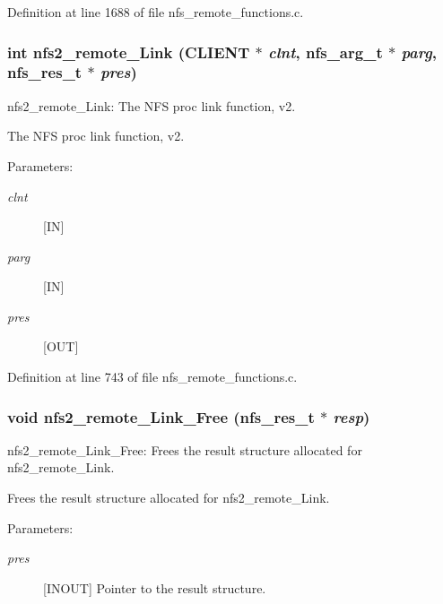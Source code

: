 Definition at line 1688 of file nfs\_\-remote\_\-functions.c.
\subsubsection[{nfs2\_\-remote\_\-Link}]{\setlength{\rightskip}{0pt plus 5cm}int nfs2\_\-remote\_\-Link (CLIENT $\ast$ {\em clnt}, \/  nfs\_\-arg\_\-t $\ast$ {\em parg}, \/  nfs\_\-res\_\-t $\ast$ {\em pres})}\label{group__NFSprocs_g3ab0ff45754d77b4f491663c61ffd6cb}


nfs2\_\-remote\_\-Link: The NFS proc link function, v2.

The NFS proc link function, v2.

\begin{Desc}
\item[Parameters:]
\begin{description}
\item[{\em clnt}][IN] \item[{\em parg}][IN] \item[{\em pres}][OUT] \end{description}
\end{Desc}


Definition at line 743 of file nfs\_\-remote\_\-functions.c.
\subsubsection[{nfs2\_\-remote\_\-Link\_\-Free}]{\setlength{\rightskip}{0pt plus 5cm}void nfs2\_\-remote\_\-Link\_\-Free (nfs\_\-res\_\-t $\ast$ {\em resp})}\label{group__NFSprocs_g0f3806f9da2e535d33a6b3624597df16}


nfs2\_\-remote\_\-Link\_\-Free: Frees the result structure allocated for nfs2\_\-remote\_\-Link.

Frees the result structure allocated for nfs2\_\-remote\_\-Link.

\begin{Desc}
\item[Parameters:]
\begin{description}
\item[{\em pres}][INOUT] Pointer to the result structure. \end{description}
\end{Desc}


